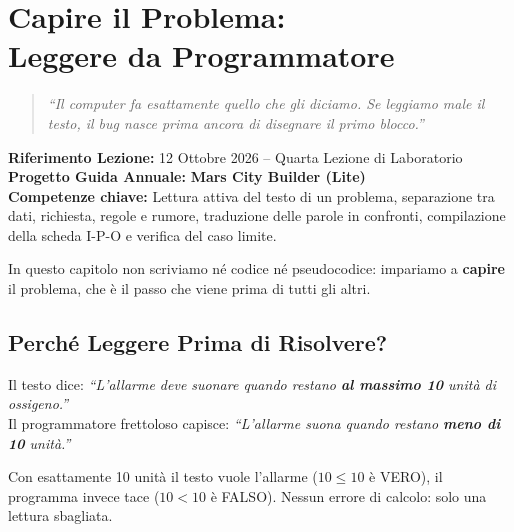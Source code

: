 \chapter[Capire il Problema: Leggere da Programmatore]{Capire il Problema:\\ Leggere da Programmatore}
\label{chap:comprensione}

\begin{quote}
\itshape
\small
``Il computer fa esattamente quello che gli diciamo. Se leggiamo male il testo, il bug nasce prima ancora di disegnare il primo blocco.''
\end{quote}
\vspace{1em}

\noindent\textbf{Riferimento Lezione:} 12 Ottobre 2026 -- Quarta Lezione di Laboratorio\\
\textbf{Progetto Guida Annuale:} \textbf{\color{PiazzaPrimary}Mars City Builder (Lite)}\\
\textbf{Competenze chiave:} Lettura attiva del testo di un problema, separazione tra dati, richiesta, regole e rumore, traduzione delle parole in confronti, compilazione della scheda I-P-O e verifica del caso limite.

\vspace{1.5em}

\noindent In questo capitolo non scriviamo né codice né pseudocodice: impariamo a \textbf{capire} il problema, che è il passo che viene prima di tutti gli altri.

\section{Perché Leggere Prima di Risolvere?}

\begin{attenzione}
Il testo dice: \emph{``L'allarme deve suonare quando restano \textbf{al massimo 10} unità di ossigeno.''}\\
Il programmatore frettoloso capisce: \emph{``L'allarme suona quando restano \textbf{meno di 10} unità.''}

\smallskip
Con esattamente 10 unità il testo vuole l'allarme ($10 \leq 10$ è VERO), il programma invece tace ($10 < 10$ è FALSO). Nessun errore di calcolo: solo una lettura sbagliata.
\end{attenzione}

